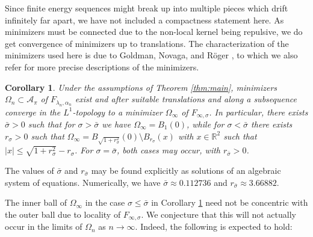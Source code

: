 \documentclass[11pt]{article}
\newcounter{statement}
\numberwithin{statement}{section}
\numberwithin{equation}{section}
\newtheorem{cor}[statement]{Corollary}
\theoremstyle{remark}
\newcommand{\R}{\mathbb R} 				%
\begin{document}
Since finite energy sequences might break up into multiple pieces
which drift infinitely far apart, we have not included a compactness
statement here.  As minimizers must be connected due to the non-local
kernel being repulsive, we do get convergence of minimizers up to
translations.  The characterization of the minimizers used here is due
to Goldman, Novaga, and R{\"o}ger \cite{goldman2020quantitative}, to
which we also refer for more precise descriptions of the minimizers.

\begin{cor}\label{cor:convergence_minimizers}
  Under the assumptions of Theorem \ref{thm:main}, minimizers
  $\Omega_n \subset \mathcal{A_\pi}$ of $F_{\lambda_n, \alpha_n}$
  exist and after suitable translations and along a subsequence
  converge in the $L^1$-topology to a minimizer $\Omega_\infty$ of
  $F_{\infty, \sigma}$.  In particular, there exists $\bar \sigma >0$
  such that for $\sigma >\bar \sigma$ we have
  $\Omega_\infty = B_1(0)$, while for $\sigma <\bar \sigma$ there
  exists $r_\sigma>0$ such that
  $\Omega_\infty = B_{\sqrt{1+r_\sigma^2}}(0)\setminus B_{r_\sigma}(x)
  $ with $x \in \R^2$ such that
  $|x| \leq \sqrt{1+r_\sigma^2} - r_\sigma$.  For
  $\sigma= \bar\sigma$, both cases may occur, with $r_{\bar\sigma}>0$.
\end{cor}
\noindent The values of $\bar \sigma$ and $r_{\bar \sigma}$ may be
  found explicitly as solutions of an algebraic system of
  equations. Numerically, we have $\bar \sigma \approx 0.112736$ and
  $r_{\bar \sigma} \approx 3.66882$.

The inner ball of $\Omega_{\infty}$ in the case
$\sigma \leq \bar \sigma$ in Corollary
  \ref{cor:convergence_minimizers} need not be concentric with the
outer ball due to locality of $F_{\infty, \sigma}$.  We conjecture
that this will not actually occur in the limits of $\Omega_n$ as
$n\to \infty$.  Indeed, the following is expected to hold:
\end{document}
